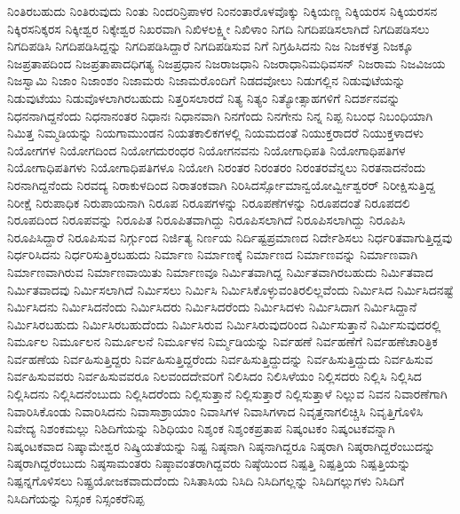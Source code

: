 {ನಿಂತಿರಬಹುದು
ನಿಂತಿರುವುದು
ನಿಂತು
ನಿಂದರಿನ್ರಿಪಾಳರ
ನಿಂನಂತಾರೊಳವೊಕ್ಕು
ನಿಕ್ಕಿಯಣ್ಣ
ನಿಕ್ಕಿಯರಸ
ನಿಕ್ಕಿಯರಸನ
ನಿಕ್ಕಿರಸನಿಕ್ಕರಸ
ನಿಕ್ಕೀಶ್ವರ
ನಿಕ್ಕೇಶ್ವರ
ನಿಖರವಾಗಿ
ನಿಖಿಳಲಕ್ಷ್ಮೀ
ನಿಖಿಳಾಂ
ನಿಗದಿ
ನಿಗದಿಪಡಿಸಲಾಗಿದೆ
ನಿಗದಿಪಡಿಸಲು
ನಿಗದಿಪಡಿಸಿ
ನಿಗದಿಪಡಿಸಿದ್ದನ್ನು
ನಿಗದಿಪಡಿಸಿದ್ದಾರೆ
ನಿಗದಿಪಡಿಸುವ
ನಿಗೆ
ನಿಗ್ರಹಿಸಿದನು
ನಿಜ
ನಿಜಕಳತ್ರ
ನಿಜಕ್ಕೂ
ನಿಜಪ್ರತಾಪದಿಂದ
ನಿಜಪ್ರತಾಪಾದಧಿಗತ್ಯ
ನಿಜಪ್ರಧಾನ
ನಿಜರಾಜಧಾನಿ
ನಿಜರಾಧಾನಿಮಧಿವಸನ್
ನಿಜರಾಮ
ನಿಜವಿಜಯ
ನಿಜಸ್ವಾಮಿ
ನಿಜಾಂ
ನಿಜಾಂಶಂ
ನಿಜಾಮರು
ನಿಜಾಮರೊಂದಿಗೆ
ನಿಡದವೋಲು
ನಿಡುಗಲ್ಲಿನ
ನಿಡುವುಟೆಯನ್ನು
ನಿಡುವುಟೆಯು
ನಿಡುವೊಳಲಾಗಿರಬಹುದು
ನಿತ್ತರಿಸಲಾರದೆ
ನಿತ್ಯ
ನಿತ್ಯಂ
ನಿತ್ಯೋತ್ಸಾಹಗಳಿಗೆ
ನಿದರ್ಶನವನ್ನು
ನಿಧನನಾಗಿದ್ದನೆಂದು
ನಿಧನಾನಂತರ
ನಿಧಾನಃ
ನಿಧಾನವಾಗಿ
ನಿನಗೆಂದು
ನಿನಗೇನು
ನಿನ್ನ
ನಿಪ್ಪ
ನಿಬಂಧ
ನಿಬಂಧಿಯಾಗಿ
ನಿಮಿತ್ತ
ನಿಮ್ಮಡಿಯನ್ನು
ನಿಯಗಾಮುಂಡನ
ನಿಯತಕಾಲಿಕಗಳಲ್ಲಿ
ನಿಯಮದಂತೆ
ನಿಯುಕ್ತರಾದರೆ
ನಿಯುಕ್ತಳಾದಳು
ನಿಯೋಗಗಳ
ನಿಯೋಗದಿಂದ
ನಿಯೋಗದುರಂಧರ
ನಿಯೋಗನವನು
ನಿಯೋಗಾಧಿಪತಿ
ನಿಯೋಗಾಧಿಪತಿಗಳ
ನಿಯೋಗಾಧಿಪತಿಗಳು
ನಿಯೋಗಾಧಿಪತಿಗಳೂ
ನಿಯೋಗಿ
ನಿರಂತರ
ನಿರಂತರಂ
ನಿರಂತರವೆನ್ನಲು
ನಿರತನಾದನೆಂದು
ನಿರನಾಗಿದ್ದನೆಂದು
ನಿರವದ್ಯ
ನಿರಾಕುಳದಿಂದ
ನಿರಾತಂಕವಾಗಿ
ನಿರಿಸಿದರ್ಸ್ಸೋಮಾನ್ವಯೋರ್ವ್ವೀಶ್ವರರ್
ನಿರೀಕ್ಷಿಸುತ್ತಿದ್ದ
ನಿರೀಕ್ಷೆ
ನಿರುಪಾಧಿಕ
ನಿರುಪಾಯನಾಗಿ
ನಿರೂಪ
ನಿರೂಪಗಳನ್ನು
ನಿರೂಪಣೆಗಳನ್ನು
ನಿರೂಪದಂತೆ
ನಿರೂಪದಲಿ
ನಿರೂಪದಿಂದ
ನಿರೂಪವನ್ನು
ನಿರೂಪಿತ
ನಿರೂಪಿತವಾಗಿದ್ದು
ನಿರೂಪಿಸಲಾಗಿದೆ
ನಿರೂಪಿಸಲಾಗಿದ್ದು
ನಿರೂಪಿಸಿ
ನಿರೂಪಿಸಿದ್ದಾರೆ
ನಿರೂಪಿಸುವ
ನಿರ್ಗ್ಗುಂದ
ನಿರ್ಜಿತ್ಯ
ನಿರ್ಣಯ
ನಿರ್ದಿಷ್ಟಪ್ರಮಾಣದ
ನಿರ್ದೇಶಿಸಲು
ನಿರ್ಧರಿತವಾಗುತ್ತಿದ್ದವು
ನಿರ್ಧರಿಸಿದನು
ನಿರ್ಧರಿಸುತ್ತಿರಬಹುದು
ನಿರ್ಮಾಣ
ನಿರ್ಮಾಣಕ್ಕೆ
ನಿರ್ಮಾಣದ
ನಿರ್ಮಾಣವನ್ನು
ನಿರ್ಮಾಣವಾಗಿ
ನಿರ್ಮಾಣವಾಗಿರುವ
ನಿರ್ಮಾಣವಾಯಿತು
ನಿರ್ಮಾಣವೂ
ನಿರ್ಮಿತವಾಗಿದ್ದ
ನಿರ್ಮಿತವಾಗಿರಬಹುದು
ನಿರ್ಮಿತವಾದ
ನಿರ್ಮಿತವಾದವು
ನಿರ್ಮಿಸಲಾಗಿದೆ
ನಿರ್ಮಿಸಲು
ನಿರ್ಮಿಸಿ
ನಿರ್ಮಿಸಿಕೊಳ್ಳುವಂತಿರಲಿಲ್ಲವೆಂದು
ನಿರ್ಮಿಸಿದ
ನಿರ್ಮಿಸಿದನಷ್ಟೆ
ನಿರ್ಮಿಸಿದನು
ನಿರ್ಮಿಸಿದನೆಂದು
ನಿರ್ಮಿಸಿದರು
ನಿರ್ಮಿಸಿದರೆಂದು
ನಿರ್ಮಿಸಿದಳು
ನಿರ್ಮಿಸಿದಾಗ
ನಿರ್ಮಿಸಿದ್ದಾನೆ
ನಿರ್ಮಿಸಿರಬಹುದು
ನಿರ್ಮಿಸಿರಬಹುದೆಂದು
ನಿರ್ಮಿಸಿರುವ
ನಿರ್ಮಿಸಿರುವುದರಿಂದ
ನಿರ್ಮಿಸುತ್ತಾನೆ
ನಿರ್ಮಿಸುವುದರಲ್ಲಿ
ನಿರ್ಮೂಲ
ನಿರ್ಮೂಲನ
ನಿರ್ಮೂಲನೆ
ನಿರ್ಮೂಳನ
ನಿರ್ಮ್ಮಡಿಯನ್ನು
ನಿರ್ವಹಣೆ
ನಿರ್ವಹಣೆಗೆ
ನಿರ್ವಹಣೆಚಾರಿತ್ರಿಕ
ನಿರ್ವಹಣೆಯ
ನಿರ್ವಹಿಸುತ್ತಿದ್ದರು
ನಿರ್ವಹಿಸುತ್ತಿದ್ದರೆಂದು
ನಿರ್ವಹಿಸುತ್ತಿದ್ದುದನ್ನು
ನಿರ್ವಹಿಸುತ್ತಿದ್ದುದು
ನಿರ್ವಹಿಸುವ
ನಿರ್ವಹಿಸುವವರು
ನಿರ್ವಹಿಸುವವರೂ
ನಿಲವಂದದೇವರಿಗೆ
ನಿಲಿಸಿದಂ
ನಿಲಿಸಿಳೆಯಂ
ನಿಲ್ಲಿಸದರು
ನಿಲ್ಲಿಸಿ
ನಿಲ್ಲಿಸಿದ
ನಿಲ್ಲಿಸಿದನು
ನಿಲ್ಲಿಸಿದನೆಂಬುದು
ನಿಲ್ಲಿಸಿದರೆಂದು
ನಿಲ್ಲಿಸುತ್ತಾನೆ
ನಿಲ್ಲಿಸುತ್ತಾರೆ
ನಿಲ್ಲಿಸುತ್ತಾಳೆ
ನಿಲ್ಲುವ
ನಿವನ
ನಿವಾರಣೆಗಾಗಿ
ನಿವಾರಿಸಿಕೊಂಡು
ನಿವಾರಿಸಿದನು
ನಿವಾಸಾಶ್ರಾಯಾಂ
ನಿವಾಸಿಗಳ
ನಿವಾಸಿಗಳಾದ
ನಿವೃತ್ತನಾಗಲಿಚ್ಚಿಸಿ
ನಿವೃತ್ತಿಗೊಳಿಸಿ
ನಿವೇದ್ಯ
ನಿಶಂಕಮಲ್ಲು
ನಿಶಿದಿಗೆಯನ್ನು
ನಿಶಿಧಿಯಂ
ನಿಶ್ಶಂಕ
ನಿಶ್ಶಂಕಪ್ರತಾಪ
ನಿಷ್ಕಂಟಕಂ
ನಿಷ್ಕಂಟಕವನ್ನಾಗಿ
ನಿಷ್ಕಂಟಕವಾದ
ನಿಷ್ಕಾಮೇಶ್ವರ
ನಿಷ್ಕ್ರಿಯತೆಯನ್ನು
ನಿಷ್ಟ
ನಿಷ್ಠನಾಗಿ
ನಿಷ್ಠನಾಗಿದ್ದರೂ
ನಿಷ್ಠರಾಗಿ
ನಿಷ್ಠರಾಗಿದ್ದರೆಂಬುದನ್ನು
ನಿಷ್ಠರಾಗಿದ್ದರೆಂಬುದು
ನಿಷ್ಠಸಾಮಂತರು
ನಿಷ್ಠಾವಂತರಾಗಿದ್ದವರು
ನಿಷ್ಠೆಯಿಂದ
ನಿಷ್ಪತ್ತಿ
ನಿಷ್ಪತ್ತಿಯ
ನಿಷ್ಪತ್ತಿಯನ್ನು
ನಿಷ್ಪನ್ನಗೊಳಿಸಲು
ನಿಷ್ಪ್ರಯೋಜಕವಾದುದೆಂದು
ನಿಸಿತಾಸಿಯ
ನಿಸಿದಿ
ನಿಸಿದಿಗಲ್ಲನ್ನು
ನಿಸಿದಿಗಲ್ಲುಗಳು
ನಿಸಿದಿಗೆ
ನಿಸಿದಿಗೆಯನ್ನು
ನಿಸ್ಸಂಕ
ನಿಸ್ಸಂಕರೆನಿಪ್ಪ
}
